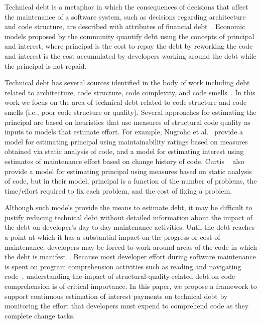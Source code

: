 Technical debt is a metaphor in which the consequences of decisions that affect the maintenance of a software system, such as decisions regarding architecture and code structure, are described with attributes of financial debt~\cite{Cunningham:1992}. Economic models proposed by the \TD community quantify debt using the concepts of principal and interest, where principal is the cost to repay the debt by reworking the code and interest is the cost accumulated by developers working around the debt while the principal is not repaid.

Technical debt has several sources identified in the body of work including debt related to architecture, code structure, code complexity, and code smells~\cite{Ozkaya_etal:2012}.  In this work we focus on the area of technical debt related to code structure and code smells (i.e., poor code structure or quality).  Several approaches for estimating the \TD principal are based on heuristics that use measures of structural code quality as inputs to models that estimate effort. For example, Nugroho et al.~\cite{Nugroho_etal:2011} provide a model for estimating principal using maintainability ratings based on measures obtained via static analysis of code, and a model for estimating interest using estimates of maintenance effort based on change history of code. Curtis \etal~\cite{Curtis_etal:2012} also provide a model for estimating principal using measures based on static analysis of code, but in their model, principal is a function of the number of problems, the time/effort required to fix each problem, and the cost of fixing a problem.

Although such models provide the means to estimate debt, it may be difficult to justify reducing technical debt without detailed information about the impact of the debt on developer's day-to-day maintenance activities. Until the debt reaches a point at which it has a substantial impact on the progress or cost of maintenance, developers may be forced to work around areas of the code in which the debt is manifest~\cite{Ozkaya_etal:2011}. 
Because most developer effort during software maintenance is spent on program comprehension activities such as reading and navigating code~\cite{Fjeldstad_Hamlen:1982,Standish:1984,Ko_etal:2006,LaToza_etal:2006,Tiarks:2011}, understanding the impact of structural-quality-related debt on code comprehension is of critical importance. In this paper, we propose a framework to support continuous estimation of interest payments on technical debt by monitoring the effort that developers must expend to comprehend code as they complete change tasks. 


